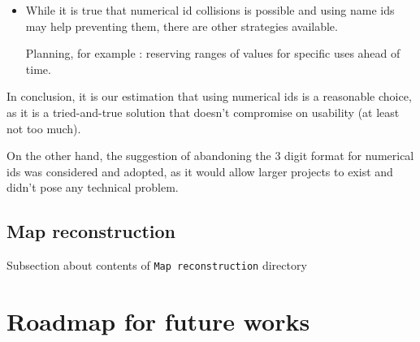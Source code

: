 \documentclass[11pt]{article}
\begin{document}
{\begin{itemize}
\begin{itemize}
		\item Not all characters are usable : every file system imposes limitations, which would impose unwanted restrictions for developers.
		
		\item Dealing with names/strings means that ids are typically longer and less formally defined (can contain more caracters, including casing, accents, etc), therefore amplifying the risk of any id containing errors.
		
		
		\item Developers involved in this type of project are typically capable of dealing with numerical ids without issue already.
		
		\item For large projects with hundreds/thousands of maps, name collisions may force developers to use convoluted or cumbersome naming schemes.
	\end{itemize}
	
	Note that some of the issues identified may be circumvented by re-introducing the "name" field in the files themselves, but at this point the percieved value of the change would become nil.
	
	\item While it is true that numerical id collisions is possible and using name ids may help preventing them, there are other strategies available. 
	
	Planning, for example : reserving ranges of values for specific uses ahead of time.
\end{itemize}

\vspace{4mm}
In conclusion, it is our estimation that using numerical ids is a reasonable choice, as it is a tried-and-true solution that doesn't compromise on usability (at least not too much).

On the other hand, the suggestion of abandoning the 3 digit format for numerical ids was considered and adopted, as it would allow larger projects to exist and didn't pose any technical problem.

\newpage
\subsection{Map reconstruction}


Subsection about contents of \texttt{Map reconstruction} directory




\newpage 
\section{Roadmap for future works}



}
\end{document}
